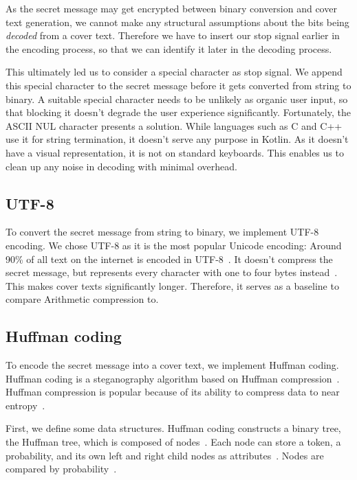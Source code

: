 As the secret message may get encrypted between binary conversion and cover text generation, we cannot make any structural assumptions about the bits being \textit{decoded} from a cover text. Therefore we have to insert our stop signal earlier in the encoding process, so that we can identify it later in the decoding process.

This ultimately led us to consider a special character as stop signal. We append this special character to the secret message before it gets converted from string to binary. A suitable special character needs to be unlikely as organic user input, so that blocking it doesn't degrade the user experience significantly. Fortunately, the ASCII NUL character presents a solution. While languages such as C and C++ use it for string termination, it doesn't serve any purpose in Kotlin. As it doesn't have a visual representation, it is not on standard keyboards. This enables us to clean up any noise in decoding with minimal overhead.

\subsection{UTF-8}
\label{sec:utf8}
To convert the secret message from string to binary, we implement UTF-8 encoding. We chose UTF-8 as it is the most popular Unicode encoding: Around 90\% of all text on the internet is encoded in UTF-8~\cite{gleaveMakingCompressionAlgorithms2017}. It doesn't compress the secret message, but represents every character with one to four bytes instead~\cite{gleaveMakingCompressionAlgorithms2017}. This makes cover texts significantly longer. Therefore, it serves as a baseline to compare Arithmetic compression to.

\subsection{Huffman coding}
\label{sec:huffmanCoding}
To encode the secret message into a cover text, we implement Huffman coding. Huffman coding is a steganography algorithm based on Huffman compression~\cite{zieglerNeuralLinguisticSteganography2019,yangRNNStegaLinguisticSteganography2019}. Huffman compression is popular because of its ability to compress data to near entropy~\cite{huffmanMethodConstructionMinimumRedundancy1952}.

First, we define some data structures. Huffman coding constructs a binary tree, the Huffman tree, which is composed of nodes~\cite{huffmanMethodConstructionMinimumRedundancy1952}. Each node can store a token, a probability, and its own left and right child nodes as attributes~\cite{huffmanMethodConstructionMinimumRedundancy1952}. Nodes are compared by probability~\cite{huffmanMethodConstructionMinimumRedundancy1952}.

